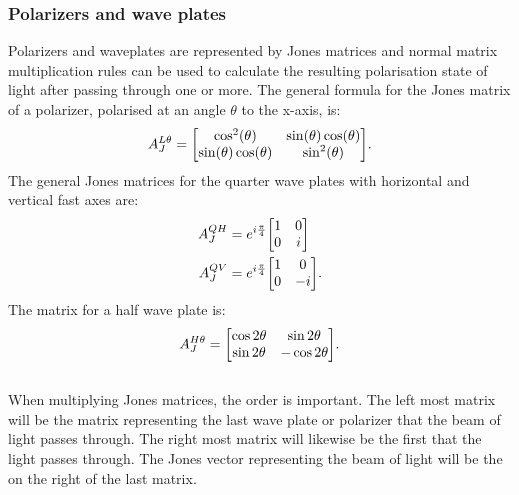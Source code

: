 \subsubsection{Polarizers and wave plates}
Polarizers and waveplates are represented by Jones matrices and normal matrix multiplication rules can be used to calculate the resulting polarisation state of light after passing through one or more.
The general formula for the Jones matrix of a polarizer, polarised at an angle \(\theta\) to the x-axis, is:
\begin{equation}
A_J^{L\theta} = \mqty[\cos[2](\theta) & \sin(\theta)\cos(\theta) \\ \sin(\theta)\cos(\theta) & \sin[2](\theta)].
\label{eqn:ItP:Polarizermat}
\end{equation}
The general Jones matrices for the quarter wave plates with horizontal and vertical fast axes are:
\begin{align}
A_J^{QH} &= e^{i\frac{\pi}{4}}\mqty[1 & 0 \\ 0 & i]  \label{eqn:ItP:QHmat} \\
A_J^{QV} &= e^{i\frac{\pi}{4}}\mqty[1 & 0 \\ 0 & -i]. \label{eqn:ItP:QVmat}
\end{align}
The matrix for a half wave plate is:
\begin{align}
A_J^{H\theta} = \mqty[\cos 2\theta & \sin 2\theta \\ \sin 2\theta & -\cos 2\theta].
\label{eqn:ItP:HwpMat}
\end{align}
\\
When multiplying Jones matrices, the order is important.
The left most matrix will be the matrix representing the last wave plate or polarizer that the beam of light passes through. 
The right most matrix will likewise be the first that the light passes through.
The Jones vector representing the beam of light will be the on the right of the last matrix.
